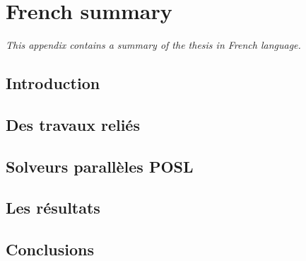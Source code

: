 \chapter{French summary}
\label{app:res_franc}
\textit{This appendix contains a summary of the thesis in French language.}
\vfill
\minitoc
\newpage

\section{Introduction}


\section {Des travaux reli\'es}


\section{Solveurs parallèles POSL}


\section{Les résultats}


\section{Conclusions}
